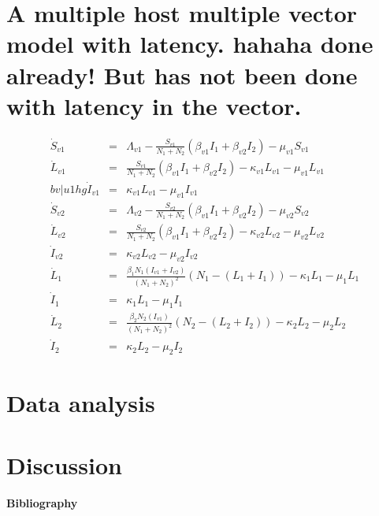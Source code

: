 \documentclass[preprint,12pt]{elsarticle}
\begin{document}
\section{A multiple host multiple vector model with latency. hahaha done already! But has not been done with latency in the vector.}
\begin{equation}
\begin{array}{lcl}
\dot{S}_{v1}&=&\Lambda_{v1}-\frac{S_{v1}}{N_1+N_2}\left(\beta_{v1}I_1+\beta_{v2}I_2\right)-\mu_{v1}S_{v1}\\
\dot{L}_{v1}&=&\frac{S_{v1}}{N_1+N_2}\left(\beta_{v1}I_1+\beta_{v2}I_2\right)-\kappa_{v1}L_{v1}-\mu_{v1}L_{v1}\\b v|  u1hg
\dot{I}_{v1}&=&\kappa_{v1}L_{v1}-\mu_{v1}I_{v1}\\

\dot{S}_{v2}&=&\Lambda_{v2}-\frac{S_{v2}}{N_1+N_2}\left(\beta_{v1}I_1+\beta_{v2}I_2\right)-\mu_{v2}S_{v2}\\
\dot{L}_{v2}&=&\frac{S_{v2}}{N_1+N_2}\left(\beta_{v1}I_1+\beta_{v2}I_2\right)-\kappa_{v2}L_{v2}-\mu_{v2}L_{v2}\\
\dot{I}_{v2}&=&\kappa_{v2}L_{v2}-\mu_{v2}I_{v2}\\

\dot{L}_1&=&\frac{\beta_1N_1(I_{v1}+I_{v2})}{(N_1+N_2)^2}\left(N_1-\left(L_1+I_1\right)\right)-\kappa_1L_1 -\mu_1 L_1 \\
\dot{I}_1&=& \kappa_1L_1-\mu_1I_1\\

\dot{L}_2&=&\frac{\beta_2N_2(I_{v1})}{(N_1+N_2)^2}\left(N_2-\left(L_2+I_2\right)\right)-\kappa_2L_2 -\mu_2 L_2 \\
\dot{I}_2&=& \kappa_2L_2-\mu_2I_2

\end{array}
\end{equation}

\section{Data analysis}
\section{Discussion}



\textbf{Bibliography}


\end{document}
